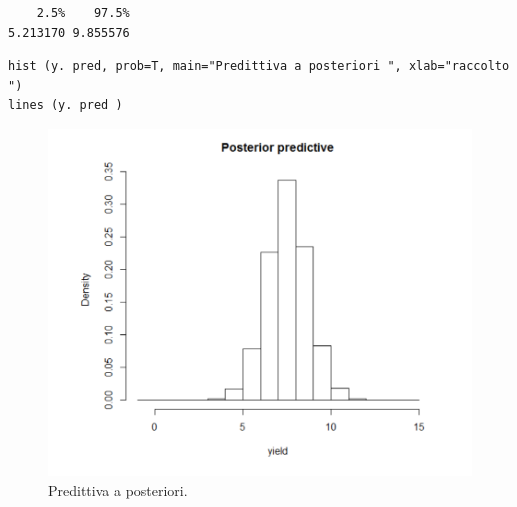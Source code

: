{
\color{red}
\begin{Verbatim}
    2.5%    97.5%
5.213170 9.855576
\end{Verbatim}
}

\begin{lstlisting}[style=R]
hist (y. pred, prob=T, main="Predittiva a posteriori ", xlab="raccolto ")
lines (y. pred )
\end{lstlisting}

\begin{figure}
    \centering
    \includegraphics[totalheight=10cm]{img/esercizio11-2-6.png}
    \caption{   Predittiva a posteriori.}
\end{figure}